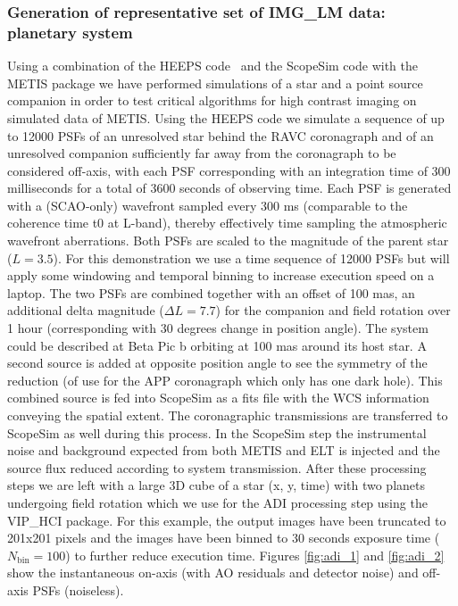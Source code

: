 \subsubsection{Generation of representative set of IMG\_LM data: planetary system}
Using a combination of the HEEPS code~\cite{HEEPS} and the ScopeSim code with the METIS package we have performed simulations of a star and a point source companion in order to test critical algorithms for high contrast imaging on simulated data of METIS.
Using the HEEPS code we simulate a sequence of up to 12000 PSFs of an unresolved star behind the RAVC coronagraph and of an unresolved companion sufficiently far away from the coronagraph to be considered off-axis, with each PSF corresponding with an integration time of 300 milliseconds for a total of 3600 seconds of observing time. Each PSF is generated with a (SCAO-only) wavefront sampled every 300 ms (comparable to the coherence time t0 at L-band), thereby effectively time sampling the atmospheric wavefront aberrations. Both PSFs are scaled to the magnitude of the parent star ($L=3.5$). For this demonstration we use a time sequence of 12000 PSFs but will apply some windowing and temporal binning to increase execution speed on a laptop. 
The two PSFs are combined together with an offset of 100 mas, an additional delta magnitude ($\Delta L=7.7$) for the companion and field rotation over 1 hour (corresponding with 30 degrees change in position angle). The system could be described at Beta Pic b orbiting at 100 mas around its host star. A second source is added at opposite position angle to see the symmetry of the reduction (of use for the APP coronagraph which only has one dark hole). This combined source is fed into ScopeSim as a fits file with the WCS information conveying the spatial extent. The coronagraphic transmissions are transferred to ScopeSim as well during this process.
In the ScopeSim step the instrumental noise and background expected from both METIS and ELT is injected and the source flux reduced according to system transmission. 
After these processing steps we are left with a large 3D cube of a star (x, y, time) with two planets undergoing field rotation which we use for the ADI processing step using the VIP\_HCI package. For this example, the output images have been truncated to 201x201 pixels and the images have been binned to 30 seconds exposure time ($N_\mathrm{bin}=100$) to further reduce execution time. Figures \ref{fig:adi_1} and \ref{fig:adi_2} show the instantaneous on-axis (with AO residuals and detector noise) and off-axis PSFs (noiseless). 
